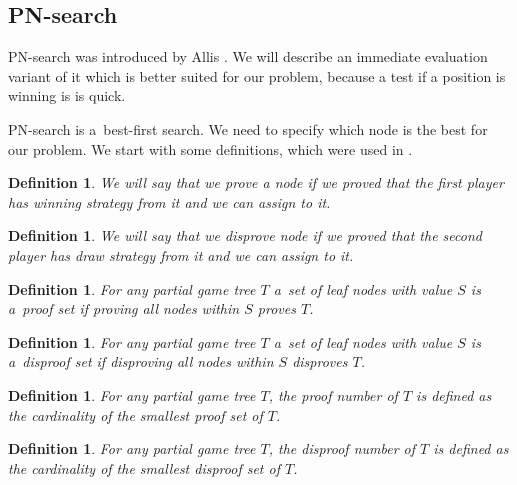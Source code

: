 \subsection{PN-search}

PN-search was introduced by Allis . We will describe an immediate evaluation
variant of it which is better suited for our problem, because a test if a position is winning is
is quick.

PN-search is a~best-first search. We need to specify which node is the best for our problem.
 We start with some definitions, which were used in . 

\newtheorem*{prove}{Definition}	
\begin{prove}
We will say that we \emph{prove} a node if we proved that the first player has winning strategy
from it and we can assign \value{true} to it. 
\end{prove}

\newtheorem*{disprove}{Definition}	
\begin{disprove}
We will say that we \emph{disprove} node if we proved that the second player has draw strategy
from it and we can assign \value{false} to it. 
\end{disprove}

\newtheorem*{proofSet}{Definition}	
\begin{proofSet}
	For any partial game tree $T$ a~set of leaf nodes with value \value{unknown} $S$ is a~{\sl proof set}
	if proving all nodes within $S$ proves $T$.
\end{proofSet}

\newtheorem*{disproofSet}{Definition}	
\begin{disproofSet}
	For any partial game tree $T$ a~set of leaf nodes with value \value{unknown} $S$ is a~{\sl disproof set}
	if disproving all nodes within $S$ disproves $T$.
\end{disproofSet}

\newtheorem*{proofNumber}{Definition} 
\begin{proofNumber}
	For any partial game tree $T$, the {\sl proof number} of $T$ is defined as the 
	cardinality of the smallest proof set of $T$.
\end{proofNumber}

\newtheorem*{disproofNumber}{Definition}	
\begin{disproofNumber}
	For any partial game tree $T$, the {\sl disproof number} of $T$ is defined as the 
	cardinality of the smallest disproof set of $T$.
\end{disproofNumber}

